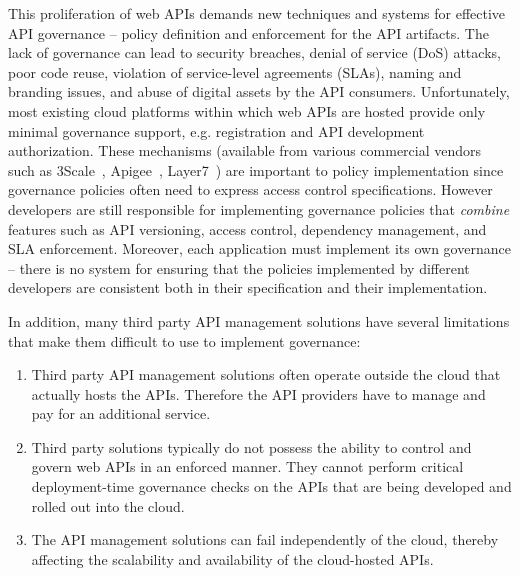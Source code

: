 This proliferation of web APIs demands new techniques and systems for 
effective API governance -- policy definition and enforcement for the API artifacts.
The lack of governance can lead to 
security breaches, denial of service (DoS)
attacks, poor code reuse, violation of service-level agreements (SLAs), 
naming and branding issues, and abuse of digital 
assets by the API consumers. Unfortunately, most existing cloud platforms
within which web APIs are hosted provide only minimal governance support, e.g.
registration and API development authorization.  These mechanisms
(available from various commercial vendors such as
3Scale~\cite{3scale}, Apigee~\cite{apigee},
Layer7~\cite{layer7})
are
important to policy implementation since governance policies often need to
express access control specifications.  
However developers are still responsible for implementing governance policies
that {\em combine} features such as 
API versioning, access control,
dependency management, and SLA enforcement.  Moreover, each application must
implement its own governance -- there is no system for ensuring that the
policies implemented by different developers are consistent both in their
specification and their implementation.

In addition, many third party 
API management solutions have several limitations that make them difficult to
use to implement governance:
\begin{enumerate}
\item Third party API management solutions often operate outside the cloud that actually hosts the APIs. Therefore 
the API providers have to manage and pay for an additional service.
\item Third party solutions typically do not possess the ability to control and govern web APIs in an enforced manner. They cannot perform 
critical deployment-time governance checks on the APIs that are being developed and rolled out into the cloud. 
\item The API management solutions can fail independently of the cloud, thereby affecting the scalability and availability of the 
cloud-hosted APIs. 
\end{enumerate}

